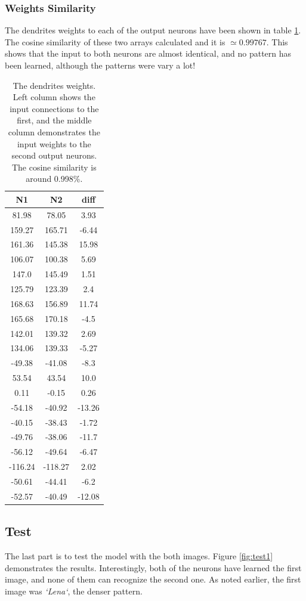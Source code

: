 \documentclass{article}
\begin{document}
	\subsubsection{Weights Similarity}
	The dendrites weights to each of the output neurons have been shown in table \ref{table:w}. The cosine similarity of these two arrays calculated and it is $\simeq 0.99767$. This shows that the input to both neurons are almost identical, and no pattern has been learned, although the patterns were vary a lot!
	\begin{table}
		\centering
		\begin{tabular}{|c|c|c|}
			\hline
			N1 & N2 & diff \\
			\hline
			81.98 & 78.05 & 3.93\\
			159.27 & 165.71 & -6.44\\
			161.36 & 145.38 & 15.98\\
			106.07 & 100.38 & 5.69\\
			147.0 & 145.49 & 1.51\\
			125.79 & 123.39 & 2.4\\
			168.63 & 156.89 & 11.74\\
			165.68 & 170.18 & -4.5\\
			142.01 & 139.32 & 2.69\\
			134.06 & 139.33 & -5.27\\
			-49.38 & -41.08 & -8.3\\
			53.54 & 43.54 & 10.0\\
			0.11 & -0.15 & 0.26\\
			-54.18 & -40.92 & -13.26\\
			-40.15 & -38.43 & -1.72\\
			-49.76 & -38.06 & -11.7\\
			-56.12 & -49.64 & -6.47\\
			-116.24 & -118.27 & 2.02\\
			-50.61 & -44.41 & -6.2\\
			-52.57 & -40.49 & -12.08\\
			\hline
		\end{tabular}
		\caption{The dendrites weights. Left column shows the input connections to the first, and the middle column demonstrates the input weights to the second output neurons. The cosine similarity is around 0.998\%.}
		\label{table:w}
	\end{table}
	\subsection{Test}
	The last part is to test the model with the both images. Figure \ref{fig:test1} demonstrates the results. Interestingly, both of the neurons have learned the first image, and none of them can recognize the second one. As noted earlier, the first image was \textit{`Lena`}, the denser pattern.
	
\end{document}
